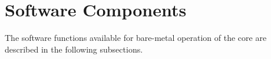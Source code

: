 \section{Software Components}
\label{sec:sw_comp}

The software functions available for bare-metal operation of the core are
described in the following subsections.



